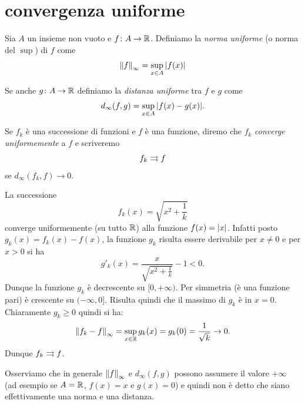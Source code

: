 \section{convergenza uniforme}

\begin{definition}
\mymark{***}
Sia $A$ un insieme non vuoto e
$f\colon A \to {\mathbb R}$.
Definiamo la \emph{norma uniforme}%
 (o norma del $\sup$)
di $f$ come
\[
  {\left\Vert f\right\Vert}_\infty = \sup_{x\in A} {\left|f(x)\right|}
\]

Se anche $g\colon A \to {\mathbb R}$
definiamo la \emph{distanza uniforme}
tra $f$ e $g$ come
\[
  d_\infty(f,g) = \sup_{x\in A} {\left|f(x)-g(x)\right|}.
\]

Se $f_k$ è una successione di funzioni e $f$ è una funzione, diremo che $f_k$
\emph{converge uniformemente}
%
%
a $f$
e scriveremo
\[
f_k \rightrightarrows f
\] se
$d_\infty(f_k,f)\to 0$.
\end{definition}


\begin{example}
\label{ex:466533}
La successione
\[
f_k(x) = \sqrt{x^2 + \frac{1}{k}}
\]
converge uniformemente (su tutto ${\mathbb R}$) alla funzione $f(x) = {\left|x\right|}$. Infatti posto $g_k(x) = f_k(x) - f(x)$, 
la funzione $g_k$ risulta essere derivabile per $x\neq 0$ e per $x>0$ si ha
\[
  g'_k(x) = \frac{x}{\sqrt{x^2+\frac 1 k}} - 1 < 0.
\]
Dunque la funzione $g_k$ è decrescente su $[0,+\infty)$. Per simmetria (è una funzione pari) è crescente su $(-\infty, 0]$. 
Risulta quindi che il massimo di $g_k$ è in $x=0$. Chiaramente $g_k \ge 0$ quindi si ha:
\[
  {\left\Vert f_k - f\right\Vert}_\infty = \sup_{x\in {\mathbb R}} g_k(x) = g_k(0) = \frac{1}{\sqrt k} \to 0.
\]
Dunque $f_k \rightrightarrows f$.
\end{example}

Osserviamo che in generale ${\left\Vert f\right\Vert}_\infty$ e $d_\infty(f,g)$ possono assumere il valore $+\infty$ (ad esempio se $A={\mathbb R}$, $f(x)=x$ e $g(x)=0$)
e quindi non è detto che siano effettivamente
una norma e una distanza.

